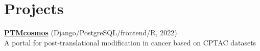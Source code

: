 \section{Projects}

\begin{multicols}{2}
    \begin{entrylist}
        \item \href{https://ptmcosmos.wustl.edu/}{\textbf{PTMcosmos}}
            (Django/PostgreSQL/frontend/R, 2022) \\
            A portal for post-translational modification in cancer based on CPTAC datasets
    \end{entrylist}
\end{multicols}

